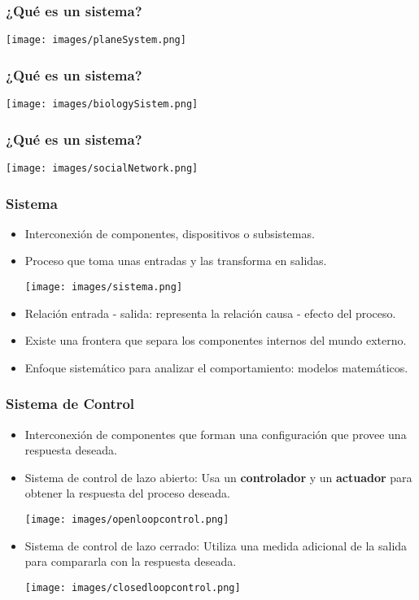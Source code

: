\documentclass[aspectratio=169,handout]{beamer}
\theoremstyle{definition}
\theoremstyle{plain}
\theoremstyle{remark}
\begin{document}
\begin{frame}[<+->][c]\frametitle{¿Qué es un sistema?}
\begin{center}
  \texttt{[image: images/planeSystem.png]}
\end{center}  
\end{frame}

\begin{frame}[<+->][c]\frametitle{¿Qué es un sistema?}
\begin{center}
  \texttt{[image: images/biologySistem.png]}
\end{center}  
\end{frame}

\begin{frame}[<+->][c]\frametitle{¿Qué es un sistema?}
\begin{center}
  \texttt{[image: images/socialNetwork.png]}
\end{center}  
\end{frame}

\begin{frame}[<+->][c]\frametitle{Sistema}
\begin{itemize}
  \item Interconexión de componentes, dispositivos o subsistemas.
  \item Proceso que toma unas entradas y las transforma en salidas.
  \begin{center}
    \texttt{[image: images/sistema.png]}
  \end{center}
  \item Relación entrada - salida: representa la relación causa - efecto del proceso.
  \item Existe una frontera que separa los componentes internos del mundo externo.
  \item Enfoque sistemático para analizar el comportamiento: modelos matemáticos.
\end{itemize} 
\end{frame}

\begin{frame}[<+->][c]\frametitle{Sistema de Control}
\begin{itemize}
  \item Interconexión de componentes que forman una configuración que provee una respuesta deseada.
  \item Sistema de control de lazo abierto: Usa un \textbf{controlador} y un \textbf{actuador} para obtener la respuesta del proceso deseada.
  \begin{center}
    \texttt{[image: images/openloopcontrol.png]}
  \end{center}  
  \item Sistema de control de lazo cerrado: Utiliza una medida adicional de la salida para compararla con la respuesta deseada.
  \begin{center}
    \texttt{[image: images/closedloopcontrol.png]}
  \end{center}  
\end{itemize}
\end{frame}
\end{document}
